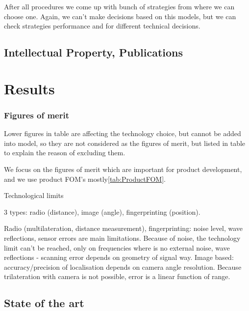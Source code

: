 After all procedures we come up with bunch of strategies from where we can choose one. Again, we can't make decisions based on this models, but we can check strategies performance and for different technical decisions.

\subsection{Intellectual Property, Publications}

\section{Results}

\subsubsection{Figures of merit}



Lower figures in table are affecting the technology choice, but cannot be added into model, so they are not considered as the figures of merit, but listed in table to explain the reason of excluding them.



We focus on the figures of merit which are important for product development, and we use product FOM's mostly\ref{tab:ProductFOM}.





Technological limits

3 types: radio (distance), image (angle), fingerprinting (position).

Radio (multilateration, distance measurement), fingerprinting: noise level, wave reflections, sensor errors are main limitations.
Because of noise, the technology limit can’t be reached, only on frequencies where is no external noise, wave reflections - scanning error depends on geometry of signal way.
Image based: accuracy/precision of localisation depends on camera angle resolution. Because trilateration with camera is not possible, error is a linear function of range.



\subsection{State of the art}





